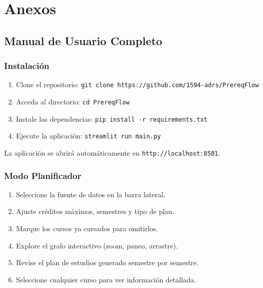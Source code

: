 \documentclass[12pt]{report}
\begin{document}
\chapter{Anexos}

\section{Manual de Usuario Completo}

\subsection{Instalación}

\begin{enumerate}
    \item Clone el repositorio: \texttt{git clone https://github.com/1594-adrs/PrereqFlow}
    \item Acceda al directorio: \texttt{cd PrereqFlow}
    \item Instale las dependencias: \texttt{pip install -r requirements.txt}
    \item Ejecute la aplicación: \texttt{streamlit run main.py}
\end{enumerate}

La aplicación se abrirá automáticamente en \texttt{http://localhost:8501}.

\subsection{Modo Planificador}
\begin{enumerate}
    \item Seleccione la fuente de datos en la barra lateral.
    \item Ajuste créditos máximos, semestres y tipo de plan.
    \item Marque los cursos ya cursados para omitirlos.
    \item Explore el grafo interactivo (zoom, paneo, arrastre).
    \item Revise el plan de estudios generado semestre por semestre.
    \item Seleccione cualquier curso para ver información detallada.
\end{enumerate}
\end{document}

